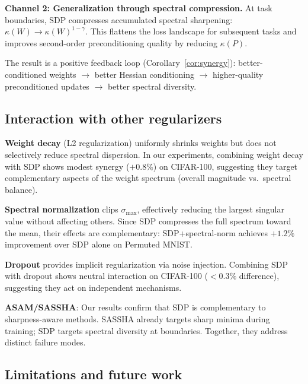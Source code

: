\documentclass{article}
\begin{document}
\textbf{Channel 2: Generalization through spectral compression.} At task boundaries, SDP compresses accumulated spectral sharpening: $\kappa(W) \to \kappa(W)^{1-\gamma}$. This flattens the loss landscape for subsequent tasks and improves second-order preconditioning quality by reducing $\kappa(P)$.

The result is a positive feedback loop (Corollary~\ref{cor:synergy}): better-conditioned weights $\to$ better Hessian conditioning $\to$ higher-quality preconditioned updates $\to$ better spectral diversity.

\subsection{Interaction with other regularizers}

\textbf{Weight decay} (L2 regularization) uniformly shrinks weights but does not selectively reduce spectral dispersion. In our experiments, combining weight decay with SDP shows modest synergy ($+0.8\%$) on CIFAR-100, suggesting they target complementary aspects of the weight spectrum (overall magnitude vs.\ spectral balance).

\textbf{Spectral normalization} clips $\sigma_{\max}$, effectively reducing the largest singular value without affecting others. Since SDP compresses the full spectrum toward the mean, their effects are complementary: SDP+spectral-norm achieves $+1.2\%$ improvement over SDP alone on Permuted MNIST.

\textbf{Dropout} provides implicit regularization via noise injection. Combining SDP with dropout shows neutral interaction on CIFAR-100 ($<0.3\%$ difference), suggesting they act on independent mechanisms.

\textbf{ASAM/SASSHA}: Our results confirm that SDP is complementary to sharpness-aware methods. SASSHA already targets sharp minima during training; SDP targets spectral diversity at boundaries. Together, they address distinct failure modes.

\subsection{Limitations and future work}
\end{document}
